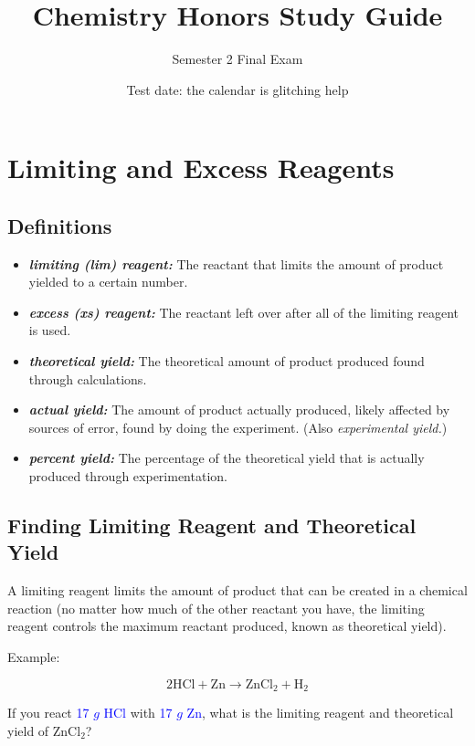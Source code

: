 \documentclass[a4paper, 12pt]{article}
\title{Chemistry Honors Study Guide}
\author{Semester 2 Final Exam}
\date{Test date: the calendar is glitching help}
\begin{document}
\maketitle

\tableofcontents

\newpage

\section{Limiting and Excess Reagents}

\subsection{Definitions}

\begin{itemize}[leftmargin=*, nosep]
    \item \textbf{\textit{limiting (lim) reagent:}} The reactant that limits the amount of product yielded to a certain number.
    \item \textbf{\textit{excess (xs) reagent:}} The reactant left over after all of the limiting reagent is used.
    \item \textbf{\textit{theoretical yield:}} The theoretical amount of product produced found through calculations.
    \item \textbf{\textit{actual yield:}} The amount of product actually produced, likely affected by sources of error, found by doing the experiment. (Also \textit{experimental yield.})
    \item \textbf{\textit{percent yield:}} The percentage of the theoretical yield that is actually produced through experimentation.
\end{itemize}

\subsection{Finding Limiting Reagent and Theoretical Yield}
A limiting reagent limits the amount of product that can be created in a chemical reaction (no matter how much of the other reactant you have, the limiting reagent controls the maximum reactant produced, known as theoretical yield).

Example:

$$2\text{HCl} + \text{Zn} \longrightarrow \text{ZnCl}_2 + \text{H}_2$$

If you react \textcolor{blue}{17 $g$ HCl} with \textcolor{blue}{17 $g$ Zn}, what is the limiting reagent and theoretical yield of ZnCl$_2$?
\end{document}
